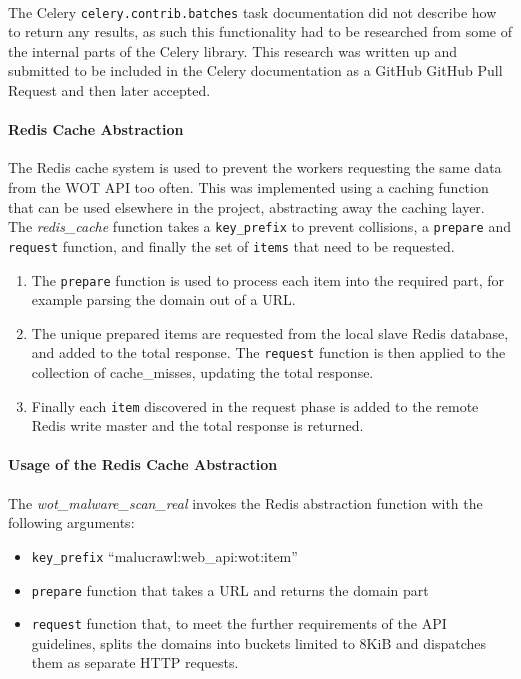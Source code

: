 \paragraph{}
The Celery \verb`celery.contrib.batches` task documentation did not describe how to return any results, as such this functionality had to be researched from some of the internal parts of the Celery library.  This research was written up and submitted to be included in the Celery documentation as a GitHub GitHub Pull Request and then later accepted\cite{celery-batches-fix}.

\paragraph{Redis Cache Abstraction}
The Redis cache system is used to prevent the workers requesting the same data from the WOT API too often.  This was implemented using a caching function that can be used elsewhere in the project, abstracting away the caching layer.  The \emph{redis\_cache} function takes a \verb`key_prefix` to prevent collisions, a \verb`prepare` and \verb`request` function, and finally the set of \verb`items` that need to be requested.

\begin{enumerate}
    \item The \verb`prepare` function is used to process each item into the required part, for example parsing the domain out of a URL.

    \item The unique prepared items are requested from the local slave Redis database, and added to the total response. The \verb`request` function is then applied to the collection of cache\_misses, updating the total response.

    \item Finally each \verb`item` discovered in the request phase is added to the remote Redis write master and the total response is returned.
\end{enumerate}

\paragraph{Usage of the Redis Cache Abstraction}
The \emph{wot\_malware\_scan\_real} invokes the Redis abstraction function with the following arguments:
\begin{itemize}
    \item \verb`key_prefix` ``malucrawl:web\_api:wot:{item}''
    \item \verb`prepare` function that takes a URL and returns the domain part
    \item \verb`request` function that, to meet the further requirements of the API guidelines, splits the domains into buckets limited to 8KiB and dispatches them as separate HTTP requests.
\end{itemize}

